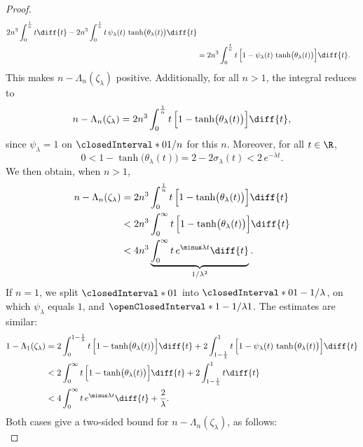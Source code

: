 \begin{proof}
\begin{align}
      2n^3 \int_{0}^{\frac{1}{n}} t \diff{t} - 
      2n^3 \int_{0}^{\frac{1}{n}} t \, \psi_\lambda(t) \, \tanh\bigl(\theta_\lambda(t)\bigr) \diff{t} \\
    &=
      2n^3 \int_{0}^{\frac{1}{n}} t \, \Bigl[1 - \psi_\lambda(t) \, \tanh\bigl(\theta_\lambda(t)\bigr)\Bigr] \diff{t}.
\end{align}
%
This makes $n - \Lambda_n (\zeta_\lambda )$ positive. Additionally, for all $n>1$, the integral reduces to 
% 
\begin{equation}
  n - \Lambda_n (\zeta_\lambda) = 2n^3 \int_{0}^{\frac{1}{n}} t \, \Bigl[1 - \tanh\bigl(\theta_\lambda(t)\bigr)\Bigr] \diff{t},
\end{equation}
%
since $\psi_\lambda = 1$ on $\closedInterval*{0}{1/n}$ for this $n$. Moreover, for all $t \in \R$,
%
\begin{equation}
  0 < 1 - \tanh\bigl(\theta_\lambda(t)\bigr) = 2 - 2\sigma_\lambda(t) < 2\, e^{\minus \lambda t}.
\end{equation}
%
We then obtain, when $n > 1$,  
%
\begin{align}
  n - \Lambda_n (\zeta_\lambda )  
    &= 2n^3 \int_{0}^{\frac{1}{n}} t \, \Bigl[1 - \tanh\bigl(\theta_\lambda(t)\bigr)\Bigr] \diff{t} \\
  & < 2n^3 \int_{0}^{\infty} t \, \Bigl[1 - \tanh\bigl(\theta_\lambda(t)\bigr)\Bigr] \diff{t} \\
  & < 4n^3 \underbrace{\int_{0}^{\infty} t \, e^{\minus \lambda t} \diff{t}}_{1 / \lambda^2}.
\end{align}
%
If $n=1$, we split $\closedInterval*{0}{1}$ into $\closedInterval*{0}{1-1/\lambda}$, on which $\psi_\lambda$ equals $1$, and %
$\openClosedInterval*{1-1/\lambda}{1}$. The estimates are similar:  
% 
\begin{align}
  1 - \Lambda_1 (\zeta_\lambda) & = 
      2 \int_{0}^{1-\frac{1}{\lambda}} t \, \Bigl[1 - \tanh\bigl(\theta_\lambda(t)\bigr)\Bigr] \diff{t} + 
      2 \int_{1-\frac{1}{\lambda}}^{1} t \, \Bigl[1 - \psi_\lambda(t) \, \tanh\bigl(\theta_\lambda(t)\bigr)\Bigr] \diff{t} \\
  & < 
      2 \int_{0}^{\infty} t \, \Bigl[1 - \tanh\bigl(\theta_\lambda(t)\bigr)\Bigr] \diff{t} + 
      2 \int_{1 - \frac{1}{\lambda}}^{1} t \diff{t} \\
  & < 
      4 \int_{0}^{\infty} t \, e^{\minus \lambda t} \diff{t} + \frac{2}{\lambda}.
\end{align}
%
Both cases give a two-sided bound for $n - \Lambda_n (\zeta_\lambda )$, as follows:
%
\begin{equation}

\end{equation}
\end{proof}
